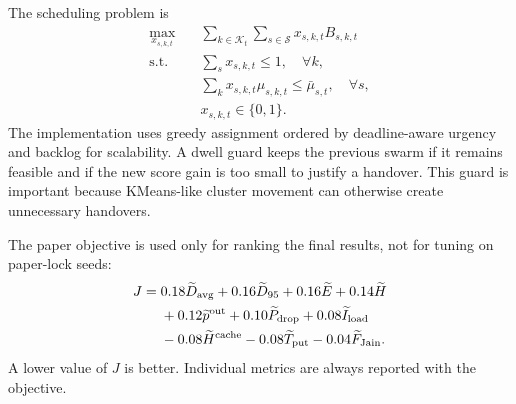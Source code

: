 The scheduling problem is
\begin{align}
\max_{x_{s,k,t}} &\quad \sum_{k\in\mathcal{K}_t}\sum_{s\in\mathcal{S}} x_{s,k,t}B_{s,k,t} \label{eq:assignment_problem}\\
\mathrm{s.t.} &\quad \sum_s x_{s,k,t}\leq 1,\quad \forall k,\nonumber\\
&\quad \sum_k x_{s,k,t}\mu_{s,k,t}\leq \bar{\mu}_{s,t},\quad \forall s,\nonumber\\
&\quad x_{s,k,t}\in\{0,1\}.\nonumber
\end{align}
The implementation uses greedy assignment ordered by deadline-aware urgency and backlog for scalability. A dwell guard keeps the previous swarm if it remains feasible and if the new score gain is too small to justify a handover. This guard is important because KMeans-like cluster movement can otherwise create unnecessary handovers.

The paper objective is used only for ranking the final results, not for tuning on paper-lock seeds:
\begin{align}
J={}&0.18\widetilde{D}_{\mathrm{avg}}+0.16\widetilde{D}_{95}+0.16\widetilde{E}+0.14\widetilde{H}\nonumber\\
&+0.12\widetilde{p}^{\mathrm{out}}+0.10\widetilde{P}_{\mathrm{drop}}+0.08\widetilde{I}_{\mathrm{load}}\nonumber\\
&-0.08\widetilde{H}^{\mathrm{cache}}-0.08\widetilde{T}_{\mathrm{put}}-0.04\widetilde{F}_{\mathrm{Jain}}.
\label{eq:paper_objective}
\end{align}
A lower value of $J$ is better. Individual metrics are always reported with the objective.
